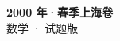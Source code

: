 \documentclass[zihao=-4, a4paper]{ctexart}
\begin{document}
\begin{center}
  {\Large\bfseries 2000 年·春季上海卷}\\[4pt]
  {\large 数学 · 试题版}
\end{center}
\medskip
{}

\end{document}
